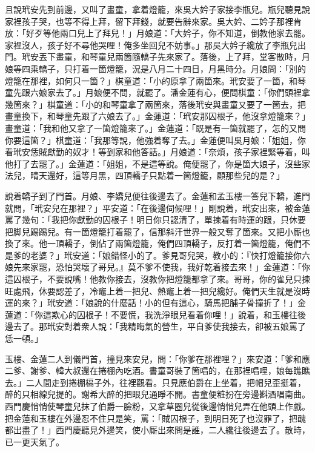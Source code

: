 且說玳安先到前邊，又叫了畫童，拿着燈籠，來吳大妗子家接李瓶兒。瓶兒聽見說家裡孩子哭，也等不得上拜，留下拜錢，就要告辭來家。吳大妗、二妗子那裡肯放：「好歹等他兩口兒上了拜兒！」月娘道：「大妗子，你不知道，倒教他家去罷。家裡沒人，孩子好不尋他哭哩！俺多坐回兒不妨事。」那吳大妗子纔放了李瓶兒出門。玳安丟下畫童，和琴童兒兩箇隨轎子先來家了。落後，上了拜，堂客散時，月娘等四乘轎子，只打着一箇燈籠，況是八月二十四日，月黑時分。月娘問：「別的燈籠在那裡，如何只一箇？」棋童道：「小的原拿了兩箇來。玳安要了一箇，和琴童先跟六娘家去了。」月娘便不問，就罷了。潘金蓮有心，便問棋童：「你們頭裡拿幾箇來？」棋童道：「小的和琴童拿了兩箇來，落後玳安與畫童又要了一箇去，把畫童換下，和琴童先跟了六娘去了。」金蓮道：「玳安那囚根子，他沒拿燈籠來？」{}畫童道：「我和他又拿了一箇燈籠來了。」金蓮道：「既是有一箇就罷了，怎的又問你要這箇？」棋童道：「我那等說，他強着奪了去。」金蓮便叫吳月娘：「姐姐，你看玳安恁賊獻勤的奴才！等到家和他答話。」月娘道：「奈煩，孩子家裡緊等着，叫他打了去罷了。」{}金蓮道：「姐姐，不是這等說。俺便罷了，你是箇大娘子，沒些家法兒，晴天還好，這等月黑，四頂轎子只點着一箇燈籠，顧那些兒的是？」

說着轎子到了門首。月娘、李嬌兒便往後邊去了。金蓮和孟玉樓一答兒下轎，進門就問，「玳安兒在那裡？」平安道：「在後邊伺候哩！」剛說着，玳安出來，被金蓮罵了幾句：「我把你獻勤的囚根子！明日你只認清了，單揀着有時運的跟，只休要把脚兒踢踢兒。有一箇燈籠打着罷了，信那斜汗世界一般又奪了箇來。又把小厮也換了來。他一頂轎子，倒佔了兩箇燈籠，俺們四頂轎子，反打着一箇燈籠，俺們不是爹的老婆？」玳安道：「娘錯怪小的了。爹見哥兒哭，教小的：『快打燈籠接你六娘先來家罷，恐怕哭壞了哥兒。』莫不爹不使我，我好乾着接去來！」金蓮道：「你這囚根子，不要說嘴！他教你接去，沒教你把燈籠都拿了來。哥哥，你的雀兒只揀旺處飛，休要認差了，冷竈上着一把兒、熱竈上着一把兒纔好。俺們天生就是沒時運的來？」玳安道：「娘說的什麼話！小的但有這心，騎馬把脯子骨撞折了！」金蓮道：「你這欺心的囚根子！不要慌，我洗淨眼兒看着你哩！」說着，和玉樓往後邊去了。那玳安對着衆人說：「我精晦氣的營生，平自爹使我接去，卻被五娘罵了恁一頓。」

玉樓、金蓮二人到儀門首，撞見來安兒，問：「你爹在那裡哩？」來安道：「爹和應二爹、謝爹、韓大叔還在捲棚內吃酒。書童哥裝了箇唱的，在那裡唱哩，娘每瞧瞧去。」二人間走到捲棚槅子外，往裡觀看。只見應伯爵在上坐着，把帽兒歪挺着，醉的只相線兒提的。謝希大醉的把眼兒通睜不開。書童便粧扮在旁邊斟酒唱南曲。西門慶悄悄使琴童兒抹了伯爵一臉粉，又拿草圈兒從後邊悄悄兒弄在他頭上作戲。把金蓮和玉樓在外邊忍不住只是笑，罵：「賊囚根子，到明日死了也沒罪了，把醜都出盡了！」西門慶聽見外邊笑，使小厮出來問是誰，二人纔往後邊去了。散時，已一更天氣了。

